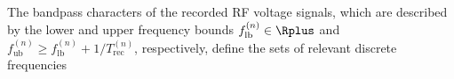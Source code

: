 The bandpass characters of
the recorded \ac{RF} voltage signals, which are described by
the lower and
upper frequency bounds
$f_{\text{lb}}^{(n)} \in \Rplus$ and
$f_{\text{ub}}^{(n)} \geq f_{\text{lb}}^{(n)} + 1 / T_{ \text{rec} }^{(n)}$,
respectively, define
the sets of
relevant discrete frequencies
